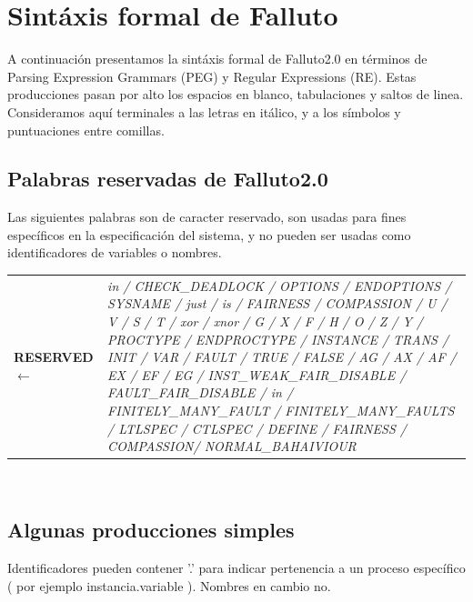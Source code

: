 \documentclass[titlepage, 12pt]{book}
\begin{document}


\chapter{Sint\'axis formal de Falluto}
\label{sintaxisFormal}

A continuaci\'on presentamos la sint\'axis formal de Falluto2.0 en t\'erminos de Parsing Expression Grammars (PEG) y Regular Expressions (RE). Estas producciones pasan por alto los espacios en blanco, tabulaciones y saltos de linea. Consideramos aqu\'i terminales a las letras en it\'alico, y a los s\'imbolos y puntuaciones entre comillas.

\section{Palabras reservadas de Falluto2.0}

Las siguientes palabras son de caracter reservado, son usadas para fines específicos en la especificación del sistema, y no pueden ser usadas como identificadores de variables o nombres.\\

\begin{tabularx}{\textwidth}{>{\bfseries}l>{\itshape}X }

RESERVED $\longleftarrow$ & in / CHECK\_DEADLOCK / OPTIONS / ENDOPTIONS / SYSNAME / just / is / FAIRNESS / COMPASSION / U / V / S / T / xor / xnor / G / X / F / H / O / Z / Y / PROCTYPE / ENDPROCTYPE / INSTANCE / TRANS / INIT / VAR / FAULT / TRUE / FALSE / AG / AX / AF / EX / EF / EG / INST\_WEAK\_FAIR\_DISABLE / FAULT\_FAIR\_DISABLE / in / FINITELY\_MANY\_FAULT / FINITELY\_MANY\_FAULTS / LTLSPEC / CTLSPEC / DEFINE / FAIRNESS / COMPASSION/ NORMAL\_BAHAIVIOUR\\
\end{tabularx}
~\\



\section{Algunas producciones simples}

Identificadores pueden contener '.' para indicar pertenencia a un proceso específico ( por ejemplo instancia.variable ). Nombres en cambio no.\\
\end{document}
